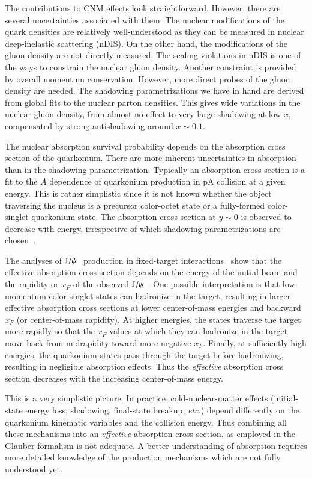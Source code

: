 The contributions to CNM effects look straightforward. However, there are several 
uncertainties associated with them. 
The nuclear modifications of the quark densities are relatively 
well-understood as they can be measured in  nuclear deep-inelastic scattering (nDIS).
On the other hand, the modifications of the gluon density are not directly measured.
The scaling violations in nDIS is one of the  
ways to constrain the nuclear gluon density. Another constraint is provided by 
overall momentum conservation.  However, more direct probes of the gluon 
density are needed. The shadowing parametrizations we have in hand are derived
from global fits to the nuclear parton densities.
This gives wide variations in the nuclear gluon 
density, from almost no effect to very large shadowing at low-$x$, 
compensated by strong antishadowing around $x \sim 0.1$.  


The nuclear absorption survival probability depends on the absorption cross section 
of the quarkonium. There are more inherent uncertainties 
in absorption than in the shadowing parametrization.
Typically an absorption cross section is a fit to the $A$ dependence 
of quarkonium production in pA collision at a given energy. 
This is rather simplistic since it is not known whether the object traversing the
nucleus is a precursor color-octet state or a fully-formed color-singlet quarkonium state.
The \jpsi absorption cross section at $y \sim 0$ is observed to decrease with energy,
irrespective of which shadowing parametrizations are chosen~\cite{Lourenco:2008sk}. 

The analyses of $\mathrm{J}/\psi\hspace {0.05in}$ production in fixed-target interactions~\cite{Lourenco:2008sk} 
show that the effective absorption
cross section depends on the energy of the initial beam and the rapidity or
$x_F$ of the observed $\mathrm{J}/\psi\hspace {0.05in}$.  One possible interpretation is that 
low-momentum color-singlet states can hadronize in the
target, resulting in larger effective absorption cross sections at lower
center-of-mass energies and backward $x_F$ (or center-of-mass rapidity).
At higher energies, the states traverse the target more rapidly so that
the $x_F$ values at which they can hadronize in the target move 
back from midrapidity toward more negative $x_F$.
Finally, at sufficiently high energies, the quarkonium states pass 
through the target before hadronizing, resulting in negligible absorption
effects.  Thus the {\it effective} absorption cross section decreases with 
the increasing center-of-mass energy.

This is a very simplistic picture. In practice, cold-nuclear-matter effects 
(initial-state energy loss, shadowing, final-state breakup, {\it etc.}) 
depend differently on the quarkonium kinematic variables and the collision energy. 
Thus combining all these mechanisms into an {\it effective} absorption cross section,
as employed in the Glauber formalism is not adequate.
A better understanding of absorption requires more detailed knowledge of the 
production mechanisms which are not fully understood yet.


